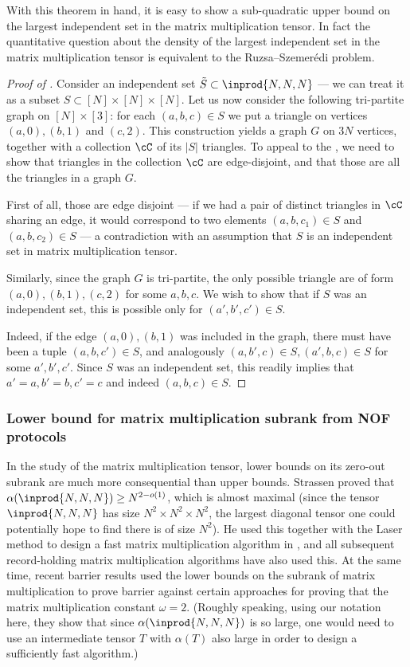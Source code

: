 With this theorem in hand, it is easy to show a sub-quadratic upper bound on the largest independent set in the matrix multiplication tensor. In fact the quantitative question about the density of the largest independent set in the matrix multiplication tensor is equivalent to the Ruzsa–Szemerédi problem.
\begin{proof}[Proof of ]
Consider an independent set $\tilde{S} \subset \inprod{N,N,N}$ --- we can treat it as a subset $S \subset [N] \times [N] \times [N]$. Let us now consider the following tri-partite graph on $[N] \times [3]$: for each $(a,b,c) \in S$ we put a triangle on vertices $(a,0), (b,1)$ and $(c,2)$. This construction yields a graph $G$ on $3 N$ vertices, together with a collection $\cC$ of its $|S|$ triangles. To appeal to the , we need to show that triangles in the collection $\cC$ are edge-disjoint, and that those are all the triangles in a graph $G$.

First of all, those are edge disjoint --- if we had a pair of distinct triangles in $\cC$ sharing an edge, it would correspond to two elements $(a,b, c_1) \in S$ and $(a,b, c_2) \in S$ --- a contradiction with an assumption that $S$ is an independent set in matrix multiplication tensor.

Similarly, since the graph $G$ is tri-partite, the only possible triangle are of form $(a,0), (b, 1), (c, 2)$ for some $a, b, c$. We wish to show that if $S$ was an independent set, this is possible only for $(a', b', c') \in S$.

Indeed, if the edge $(a, 0), (b, 1)$ was included in the graph, there must have been a tuple $(a, b, c') \in S$, and analogously $(a, b', c) \in S, (a',b,c) \in S$ for some $a', b', c'$. Since $S$ was an independent set, this readily implies that $a'=a, b'=b, c'=c$ and indeed $(a,b,c) \in S$.
\end{proof}

\subsubsection{Lower bound for matrix multiplication subrank from NOF protocols}

In the study of the matrix multiplication tensor, lower bounds on its zero-out subrank are much more consequential than upper bounds. Strassen proved that $\alpha(\inprod{N,N,N}) \geq N^{2-o(1)}$, which is almost maximal (since the tensor $\inprod{N,N,N}$ has size $N^2 \times N^2 \times N^2$, the largest diagonal tensor one could potentially hope to find there is of size $N^2$). He used this together with the Laser method to design a fast matrix multiplication algorithm in \cite{S86}, and all subsequent record-holding matrix multiplication algorithms have also used this. At the same time, recent barrier results \cite{AW21,A21,CVZ21} used the lower bounds on the subrank of matrix multiplication to prove barrier against certain approaches for proving that the matrix multiplication constant $\omega=2$. (Roughly speaking, using our notation here, they show that since $\alpha(\inprod{N,N,N})$ is so large, one would need to use an intermediate tensor $T$ with $\alpha(T)$ also large in order to design a sufficiently fast algorithm.)

